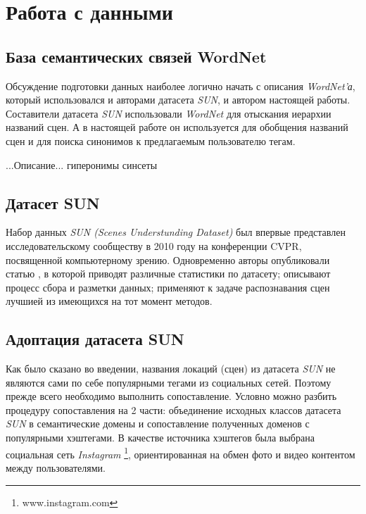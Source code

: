 \section{Работа с данными}



\subsection{База семантических связей WordNet}

\indent
\indent
Обсуждение подготовки данных наиболее логично начать с описания 
\textit{WordNet'а}, который использовался и авторами датасета \textit{SUN},
и автором настоящей работы. Составители датасета \textit{SUN} использовали
\textit{WordNet} для отыскания иерархии названий сцен. А в настоящей работе
он используется для обобщения названий сцен и для поиска синонимов
к предлагаемым пользователю тегам.

\indent
...Описание...
гиперонимы
синсеты


\subsection{Датасет SUN}

\indent
\indent
Набор данных \textit{SUN (Scenes Understunding Dataset)} был впервые 
представлен исследовательскому сообществу в 2010 году на 
конференции CVPR, посвященной компьютерному зрению. Одновременно
авторы опубликовали статью \cite{sundata}, в которой приводят различные
статистики по датасету; описывают процесс сбора и разметки данных; 
применяют к задаче распознавания сцен лучшией из имеющихся
на тот момент методов. 

\subsection{Адоптация датасета SUN}

\indent
\indent
Как было сказано во введении, названия локаций (сцен) из датасета \textit{SUN} не 
являются сами по себе популярными тегами из социальных сетей. Поэтому 
прежде всего необходимо выполнить сопоставление. Условно можно
разбить процедуру сопоставления на 2 части: объединение исходных классов 
датасета \textit{SUN} в семантические домены и сопоставление полученных доменов
с популярными хэштегами. В качестве источника хэштегов была выбрана социальная
сеть \textit{Instagram} \footnote{www.instagram.com}, ориентированная на обмен фото
и видео контентом между пользователями.

